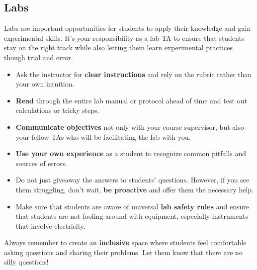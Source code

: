 \subsection{Labs}
Labs are important opportunities for students to apply their knowledge and gain experimental
skills. It's your responsibility as a lab TA to ensure that students stay on the right track while also letting them learn experimental practices though trial and error. 
\begin{itemize}[leftmargin=10pt]

    \item Ask the instructor for \textbf{clear instructions} and rely on the rubric rather than your own intuition.\\

    \item \textbf{Read} through the entire lab manual or protocol ahead of time and test out calculations or tricky steps.\\
    
    \item \textbf{Communicate objectives} not only with your course supervisor, but also your fellow TAs who will be facilitating the lab with you. \\

    \item \textbf{Use your own experience} as a student to recognize common pitfalls and sources of errors. \\
    
    \item Do not just giveaway the answers to students' questions. However, if you see them struggling, don't wait, 
    \textbf{be proactive} and offer them the necessary help.\\
    \item Make sure that students are aware of universal \textbf{lab safety rules} and ensure that students are not fooling around with equipment, especially instruments that involve electricity.    
\end{itemize}

\begin{plainexercise}
    Always remember to create an \textbf{inclusive} space where students feel comfortable asking questions and sharing their problems. Let them know that there are no silly questions!
\end{plainexercise}

